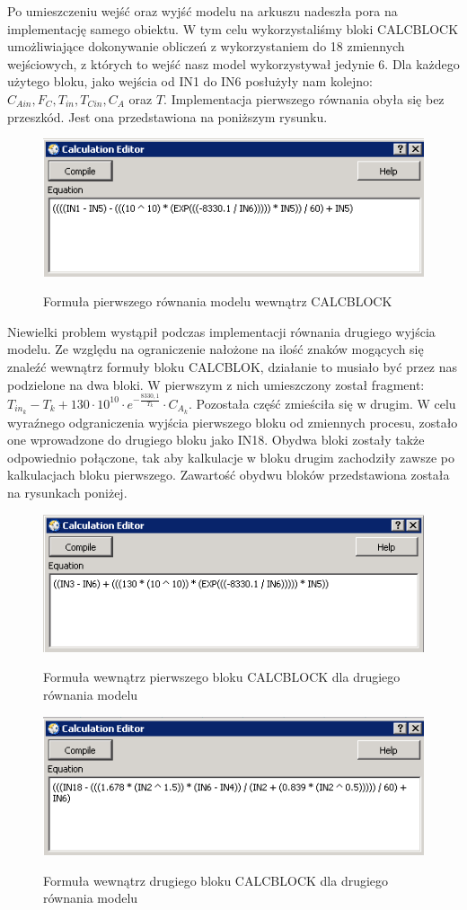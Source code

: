 Po umieszczeniu wejść oraz wyjść modelu na arkuszu nadeszła pora na implementację samego obiektu. W tym celu wykorzystaliśmy bloki CALCBLOCK umożliwiające dokonywanie obliczeń z wykorzystaniem do 18 zmiennych wejściowych, z których to wejść nasz model wykorzystywał jedynie 6. Dla każdego użytego bloku, jako wejścia od IN1 do IN6 posłużyły nam kolejno: $C_{Ain}, F_C, T_{in}, T_{Cin}, C_A$ oraz $T$. Implementacja pierwszego równania obyła się bez przeszkód. Jest ona przedstawiona na poniższym rysunku.

\begin{figure}[h!]
	\centering
	\includegraphics[width=.5\linewidth]{img/CALCBLOCK1.png}
	\label{ch1:calc1}
	\caption{Formuła pierwszego równania modelu wewnątrz CALCBLOCK}
\end{figure}

Niewielki problem wystąpił podczas implementacji równania drugiego wyjścia modelu. Ze względu na ograniczenie nałożone na ilość znaków mogących się znaleźć wewnątrz formuły bloku CALCBLOK, działanie to musiało być przez nas podzielone na dwa bloki. W pierwszym z nich umieszczony został fragment: $T_{in_k} - T_k + 130\cdot 10^{10}\cdot e^{-\frac{8330,1}{T_k}}\cdot C_{A_k}$. Pozostała część zmieściła się w drugim. W celu wyraźnego odgraniczenia wyjścia pierwszego bloku od zmiennych procesu, zostało one wprowadzone do drugiego bloku jako IN18. Obydwa bloki zostały także odpowiednio połączone, tak aby kalkulacje w bloku drugim zachodziły zawsze po kalkulacjach bloku pierwszego. Zawartość obydwu bloków przedstawiona została na rysunkach poniżej.

\begin{figure}[h!]
	\centering
	\includegraphics[width=.5\linewidth]{img/CALCBLOCK2.png}
	\label{ch1:calc2}
	\caption{Formuła wewnątrz pierwszego bloku CALCBLOCK dla drugiego równania modelu}
\end{figure}

\begin{figure}[h!]
	\centering
	\includegraphics[width=.5\linewidth]{img/CALCBLOCK3.png}
	\label{ch1:calc3}
	\caption{Formuła wewnątrz drugiego bloku CALCBLOCK dla drugiego równania modelu}
\end{figure}

